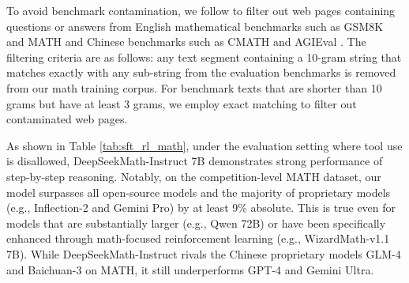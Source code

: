 To avoid benchmark contamination, we follow \cite{deepseek-coder} to filter out web pages containing questions or answers from English mathematical benchmarks such as GSM8K \citep{gsm8k} and MATH \citep{MATH} and Chinese benchmarks such as CMATH \citep{wei2023cmath} and AGIEval \citep{agieval}. The filtering criteria are as follows: any text segment containing a 10-gram string that matches exactly with any sub-string from the evaluation benchmarks is removed from our math training corpus. For benchmark texts that are shorter than 10 grams but have at least 3 grams, we employ exact matching to filter out contaminated web pages.

As shown in Table \ref{tab:sft_rl_math}, under the evaluation setting where tool use is disallowed, DeepSeekMath-Instruct 7B demonstrates strong performance of step-by-step reasoning. Notably, on the competition-level MATH dataset, our model surpasses all open-source models and the majority of proprietary models (e.g., Inflection-2 and Gemini Pro) by at least 9\% absolute. This is true even for models that are substantially larger (e.g., Qwen 72B) or have been specifically enhanced through math-focused reinforcement learning (e.g., WizardMath-v1.1 7B). While DeepSeekMath-Instruct rivals the Chinese proprietary models GLM-4 and Baichuan-3 on MATH, it still underperforms GPT-4 and Gemini Ultra.


\begin{abstract}
Mathematical reasoning poses a significant challenge for language models due to its complex and structured nature. In this paper, we introduce DeepSeekMath~7B, which continues pre-training DeepSeek-Coder-Base-v1.5 7B  with 120B math-related tokens sourced from Common Crawl, together with natural language and code data. DeepSeekMath~7B has achieved an impressive score of 51.7\% on the competition-level MATH benchmark without relying on external toolkits and voting techniques, approaching the performance level of Gemini-Ultra and GPT-4.  Self-consistency over 64 samples from DeepSeekMath~7B achieves 60.9\% on MATH. The mathematical reasoning capability of DeepSeekMath~is attributed to two key factors: First, we harness the significant potential of publicly available web data through a meticulously engineered data selection pipeline. Second, we introduce Group Relative Policy Optimization (GRPO), a variant of Proximal Policy Optimization (PPO), that enhances mathematical reasoning abilities while concurrently optimizing the memory usage of PPO.
\end{abstract}

